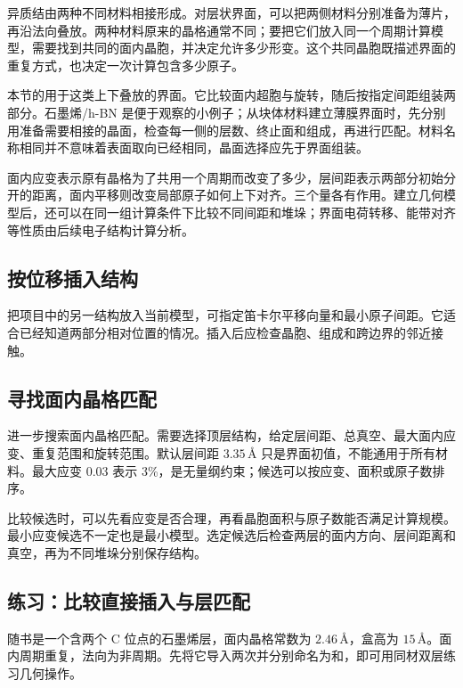 异质结由两种不同材料相接形成。对层状界面，可以把两侧材料分别准备为薄片，再沿法向叠放。两种材料原来的晶格通常不同；要把它们放入同一个周期计算模型，需要找到共同的面内晶胞，并决定允许多少形变。这个共同晶胞既描述界面的重复方式，也决定一次计算包含多少原子。

本节的用于这类上下叠放的界面。它比较面内超胞与旋转，随后按指定间距组装两部分。石墨烯/h-BN 是便于观察的小例子；从块体材料建立薄膜界面时，先分别用准备需要相接的晶面，检查每一侧的层数、终止面和组成，再进行匹配。材料名称相同并不意味着表面取向已经相同，晶面选择应先于界面组装。

面内应变表示原有晶格为了共用一个周期而改变了多少，层间距表示两部分初始分开的距离，面内平移则改变局部原子如何上下对齐。三个量各有作用。建立几何模型后，还可以在同一组计算条件下比较不同间距和堆垛；界面电荷转移、能带对齐等性质由后续电子结构计算分析。

\subsection{按位移插入结构}

把项目中的另一结构放入当前模型，可指定笛卡尔平移向量和最小原子间距。它适合已经知道两部分相对位置的情况。插入后应检查晶胞、组成和跨边界的邻近接触。

\subsection{寻找面内晶格匹配}

进一步搜索面内晶格匹配。需要选择顶层结构，给定层间距、总真空、最大面内应变、重复范围和旋转范围。默认层间距 $3.35\,\text{\AA}$ 只是界面初值，不能通用于所有材料。最大应变 0.03 表示 3\%，是无量纲约束；候选可以按应变、面积或原子数排序。

比较候选时，可以先看应变是否合理，再看晶胞面积与原子数能否满足计算规模。最小应变候选不一定也是最小模型。选定候选后检查两层的面内方向、层间距离和真空，再为不同堆垛分别保存结构。

\subsection{练习：比较直接插入与层匹配}

随书是一个含两个 C 位点的石墨烯层，面内晶格常数为 $2.46\,\text{\AA}$，盒高为 $15\,\text{\AA}$。面内周期重复，法向为非周期。先将它导入两次并分别命名为和，即可用同材双层练习几何操作。

